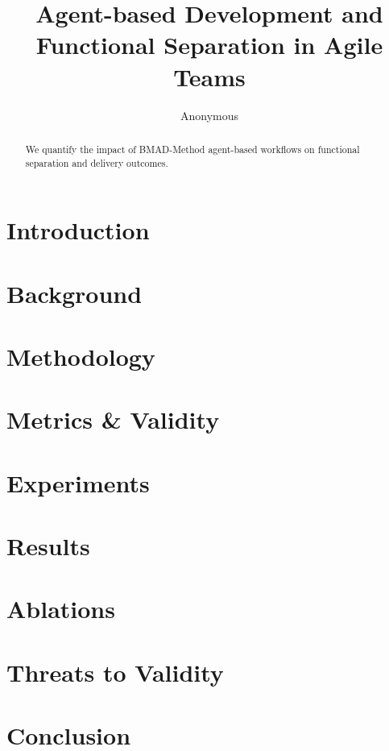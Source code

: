 \documentclass{article}
\title{Agent-based Development and Functional Separation in Agile Teams}
\author{Anonymous}
\date{}
\begin{document}
\maketitle

\begin{abstract}
We quantify the impact of BMAD-Method agent-based workflows on functional separation and delivery outcomes.
\end{abstract}

\section{Introduction}

\section{Background}

\section{Methodology}

\section{Metrics \& Validity}

\section{Experiments}

\section{Results}

\section{Ablations}

\section{Threats to Validity}

\section{Conclusion}



\end{document}
